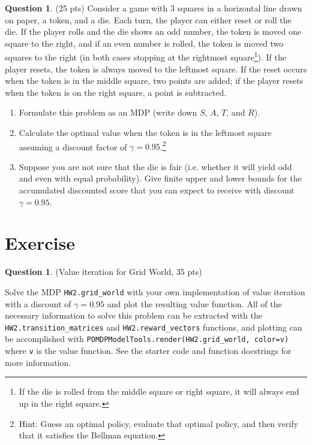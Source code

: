\documentclass{article}
\theoremstyle{definition}
\newtheorem{question}[thm]{Question}
\begin{document}
\begin{question} (25 pts)
    Consider a game with 3 squares in a horizontal line drawn on paper, a token, and a die. Each turn, the player can either reset or roll the die. If the player rolls and the die shows an odd number, the token is moved one square to the right, and if an even number is rolled, the token is moved two squares to the right (in both cases stopping at the rightmost square\footnote{If the die is rolled from the middle square or right square, it will always end up in the right square.}). If the player resets, the token is always moved to the leftmost square. If the reset occurs when the token is in the middle square, two points are added; if the player resets when the token is on the right square, a point is subtracted.
    \begin{enumerate}[label=\alph*)]
        \item Formulate this problem as an MDP (write down $S$, $A$, $T$, and $R$).
        \item Calculate the optimal value when the token is in the leftmost square assuming a discount factor of $\gamma = 0.95$.\footnote{Hint: Guess an optimal policy, evaluate that optimal policy, and then verify that it satisfies the Bellman equation.}
        \item Suppose you are not sure that the die is fair (i.e. whether it will yield odd and even with equal probability). Give finite upper and lower bounds for the accumulated discounted score that you can expect to receive with discount $\gamma = 0.95$.
    \end{enumerate}
\end{question}

\section{Exercise}

\begin{question} \label{q:gw}
    (Value iteration for Grid World, 35 pts)

    Solve the MDP \texttt{HW2.grid\_world} with your own implementation of value iteration with a discount of $\gamma=0.95$ and plot the resulting value function. All of the necessary information to solve this problem can be extracted with the \texttt{HW2.transition\_matrices} and \texttt{HW2.reward\_vectors} functions, and plotting can be accomplished with \texttt{POMDPModelTools.render(HW2.grid\_world, color=v)} where \texttt{v} is the value function. See the starter code and function docstrings for more information.
\end{question}
\end{document}
